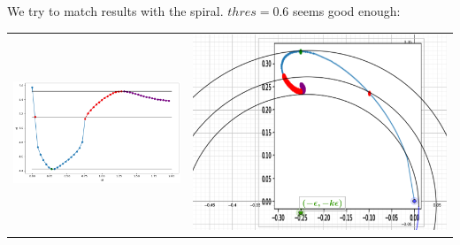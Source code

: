 \documentclass[a4paper,preprint,11pt]{article}
\begin{document}
We try to match results with the spiral. $thres=0.6$ seems good enough:
\begin{center}
\begin{tabular}{cc}
\includegraphics[scale=0.35]{CorbaMarcada.png} &
\includegraphics[scale=11]{Elipse_Espiralt.png} \\
\end{tabular}
\end{center}




\end{document}
